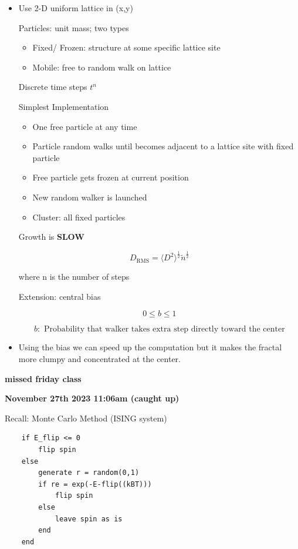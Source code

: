 \begin{itemize}
    \item Use 2-D uniform lattice in (x,y)

    Particles: unit mass; two types

    \begin{itemize}
        \item Fixed/ Frozen: structure at some specific lattice site
        \item Mobile: free to random walk on lattice
    \end{itemize}

    Discrete time steps $t^n$

    Simplest Implementation

    \begin{itemize}
        \item One free particle at any time
        \item Particle random walks until becomes adjacent to a lattice site with fixed particle
        \item Free particle gets frozen at current position
        \item New random walker is launched
        \item Cluster: all fixed particles
    \end{itemize}

    Growth is \textbf{SLOW}

    \[ D_{\text{RMS}} = \langle D^2 \rangle^{\frac{1}{2}} \tilde n^\frac{1}{2}\]

    where n is the number of steps

    Extension: central bias

    \[ 0 \le b \le 1\]

    \[ b: \text{ Probability that walker takes extra step directly toward the center}\]

    \item Using the bias we can speed up the computation but it makes the fractal more clumpy and concentrated at the center. 
\end{itemize}

\textbf{missed friday class}



\textbf{November 27th 2023 11:06am (caught up)}

Recall: Monte Carlo Method (ISING system)

\begin{verbatim}
    if E_flip <= 0
        flip spin
    else 
        generate r = random(0,1)
        if re = exp(-E-flip((kBT)))
            flip spin
        else 
            leave spin as is
        end
    end
\end{verbatim}

